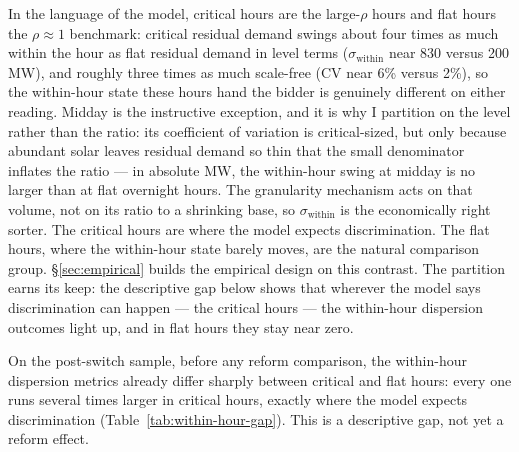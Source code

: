 \documentclass[11pt,a4paper]{article}
\theoremstyle{definition}
\theoremstyle{remark}
\theoremstyle{plain}
\begin{document}
In the language of the model, critical hours are the large-$\rho$ hours and flat hours the $\rho \approx 1$ benchmark: critical residual demand swings about four times as much within the hour as flat residual demand in level terms ($\sigma_{\text{within}}$ near 830 versus 200 MW), and roughly three times as much scale-free ($\mathrm{CV}$ near 6\% versus 2\%), so the within-hour state these hours hand the bidder is genuinely different on either reading. Midday is the instructive exception, and it is why I partition on the level rather than the ratio: its coefficient of variation is critical-sized, but only because abundant solar leaves residual demand so thin that the small denominator inflates the ratio --- in absolute MW, the within-hour swing at midday is no larger than at flat overnight hours.
The granularity mechanism acts on that volume, not on its ratio to a shrinking base, so $\sigma_{\text{within}}$ is the economically right sorter. The critical hours are where the model expects discrimination. The flat hours, where the within-hour state barely moves, are the natural comparison group. \S\ref{sec:empirical} builds the empirical design on this contrast.
The partition earns its keep: the descriptive gap below shows that wherever the model says discrimination can happen --- the critical hours --- the within-hour dispersion outcomes light up, and in flat hours they stay near zero.

On the post-switch sample, before any reform comparison, the within-hour dispersion metrics already differ sharply between critical and flat hours: every one runs several times larger in critical hours, exactly where the model expects discrimination (Table~\ref{tab:within-hour-gap}). This is a descriptive gap, not yet a reform effect.
\end{document}
